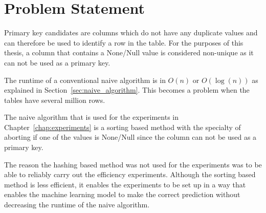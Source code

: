 \chapter{Problem Statement}\label{chap:problem_statement} %
Primary key candidates are columns which do not have any duplicate values and can therefore be used to identify a row in the table. For the purposes of this thesis, a column that contains a None/Null value is considered non-unique as it can not be used as a primary key.

The runtime of a conventional naive algorithm is in \(O(n)\) or \(O(\log(n))\) as explained in Section~\ref{sec:naive_algorithm}. This becomes a problem when the tables have several million rows.

The naive algorithm that is used for the experiments in Chapter~\ref{chap:experiments} is a sorting based method with the specialty of aborting if one of the values is None/Null since the column can not be used as a primary key.

The reason the hashing based method was not used for the experiments was to be able to reliably carry out the efficiency experiments. Although the sorting based method is less efficient, it enables the experiments to be set up in a way that enables the machine learning model to make the correct prediction without decreasing the runtime of the naive algorithm.
